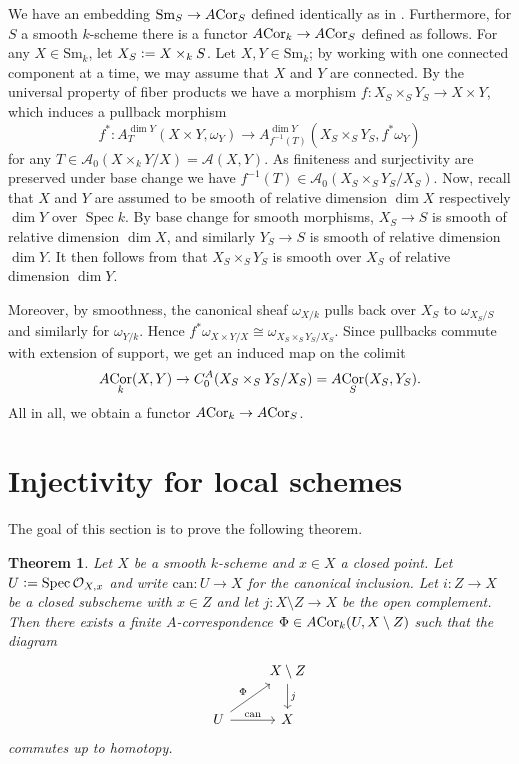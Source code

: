 \documentclass[a4paper, oneside, english,reqno]{amsart}
\theoremstyle{plain}
\newtheorem{theorem}{Theorem}[section]
\theoremstyle{definition}
\theoremstyle{remark}
\newcommand{\defeq}{\vcentcolon=}
\newcommand{\ACor}{A\mkern-3mu\Cor}
\newcommand{\calA}{\mathcal{A}}
\newcommand{\calO}{\mathcal{O}}
\newcommand{\Sm}{\mathrm{Sm}}
\newcommand{\can}{\mathrm{can}}
\DeclareMathOperator{\Spec}{Spec}
\DeclareMathOperator{\Cor}{Cor}
\begin{document}
We have an embedding $\Sm_S\to \ACor_S$ defined identically as in \cite{Calmes-Fasel}. Furthermore, for $S$ a smooth $k$-scheme there is a functor $\ACor_k\to \ACor_S$ defined as follows. For any $X\in\Sm_k$, let $X_S\defeq X\times_k S$. Let $X,Y\in\Sm_k$; by working with one connected component at a time, we may assume that $X$ and $Y$ are connected. By the universal property of fiber products we have a morphism $f\colon X_S\times_S Y_S\to X\times Y$, which induces a pullback morphism
\[
f^*\colon A_T^{\dim Y}(X\times Y,\omega_{Y})\to A_{f^{-1}(T)}^{\dim Y}(X_S\times_S Y_S,f^*\omega_{Y})
\]for any $T\in\calA_0(X\times_k Y/X)=\calA(X,Y)$. As finiteness and surjectivity are preserved under base change we have $f^{-1}(T)\in\calA_0(X_S\times_S Y_S/X_S)$. Now, recall that $X$ and $Y$ are assumed to be smooth of relative dimension $\dim X$ respectively $\dim Y$ over $\Spec k$. By base change for smooth morphisms, $X_S\to S$ is smooth of relative dimension $\dim X$, and similarly $Y_S\to S$ is smooth of relative dimension $\dim Y$. It then follows from \cite[III Proposition 10.1]{Hartshorne} that $X_S\times_S Y_S$ is smooth over $X_S$ of relative dimension $\dim Y$.

Moreover, by smoothness, the canonical sheaf $\omega_{X/k}$ pulls back over $X_S$ to $\omega_{X_S/S}$ and similarly for $\omega_{Y/k}$. Hence $f^*\omega_{X\times Y/X}\cong\omega_{X_S\times_S Y_S/X_S}$. Since pullbacks commute with extension of support, we get an induced map on the colimit
\[
\ACor_k(X,Y)\to C^A_0(X_S\times_S Y_S/X_S)=\ACor_S(X_S,Y_S).
\]
All in all, we obtain a functor $\ACor_k\to \ACor_S$.

\section{Injectivity for local schemes}\label{section:inj-loc-sch}
The goal of this section is to prove the following theorem.

\begin{theorem}\label{thm:inj-loc-sch}
Let $X$ be a smooth $k$-scheme and $x\in X$ a closed point. Let $U\defeq\Spec\calO_{X,x}$ and write $\can\colon U\rightarrow X$ for the canonical inclusion. Let $i\colon Z\to X$ be a closed subscheme with $x\in Z$ and let $j\colon X\setminus Z\to X$ be the open complement. Then there exists a finite $A$-correspondence $\Phi\in\ACor_k(U,X\setminus Z)$ such that the diagram
\[\begin{tikzcd}
& X\setminus Z\ar[d,"j"]\\
U\ar[ur,"\Phi"]\ar[r,"\can"] & X
\end{tikzcd}\]
commutes up to homotopy.
\end{theorem}
\end{document}
